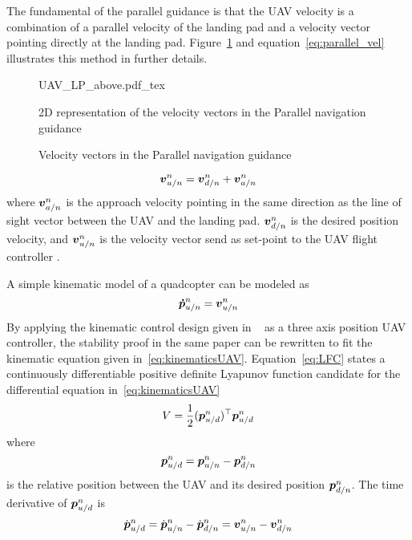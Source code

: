The fundamental of the parallel guidance is that the UAV velocity is a combination of a parallel velocity of the landing pad and a velocity vector pointing directly at the landing pad. Figure~\ref{fig:parallel_navigation} and equation~\ref{eq:parallel_vel} illustrates this method in further details.
\begin{figure}[ht]
    \centering
    {UAV_LP_above.pdf_tex}
    \caption{Velocity vectors in the Parallel navigation guidance}{2D representation of the velocity vectors in the Parallel navigation guidance}
    \label{fig:parallel_navigation}
\end{figure}
\begin{equation}\label{eq:parallel_vel}
	\boldsymbol{v}^{n}_{u/n}=\boldsymbol{v}^{n}_{d/n}+\boldsymbol{v}^{n}_{a/n}
\end{equation}
where $\boldsymbol{v}^{n}_{a/n}$ is the approach velocity pointing in the same direction as the line of sight vector between the UAV and the landing pad. $\boldsymbol{v}^{n}_{d/n}$ is the desired position velocity, and $\boldsymbol{v}^{n}_{u/n}$ is the velocity vector send as set-point to the UAV flight controller \citep{Fossen2011}. 

A simple kinematic model of a quadcopter can be modeled as
\begin{equation}\label{eq:kinematicsUAV}
	\boldsymbol{\dot{p}}_{u/n}^n=\boldsymbol{v}^n_{u/n}
\end{equation}
By applying the kinematic control design given in ~\cite{BREIVIK2007349} as a three axis position UAV controller, the stability proof in the same paper can be rewritten to fit the kinematic equation given in~\ref{eq:kinematicsUAV}. Equation~\ref{eq:LFC} states a continuously differentiable positive definite Lyapunov function candidate for the differential equation in~\ref{eq:kinematicsUAV}
\begin{equation}\label{eq:LFC}
	V=\frac{1}{2}(\boldsymbol{p}_{u/d}^{n})^{\top}\boldsymbol{p}_{u/d}^{n}
\end{equation}
where
\begin{equation}
	\boldsymbol{p}_{u/d}^{n}=\boldsymbol{p}^n_{u/n}-\boldsymbol{p}_{d/n}^n
\end{equation}
is the relative position between the UAV and its desired position $\boldsymbol{p}_{d/n}^n$. The time derivative of $\boldsymbol{p}_{u/d}^n$ is
\begin{equation}
	\dot{\boldsymbol{p}}_{u/d}^n=\dot{\boldsymbol{p}}^n_{u/n}-\dot{\boldsymbol{p}}_{d/n}^n=\boldsymbol{v}^n_{u/n}-\boldsymbol{v}_{d/n}^n
\end{equation}

